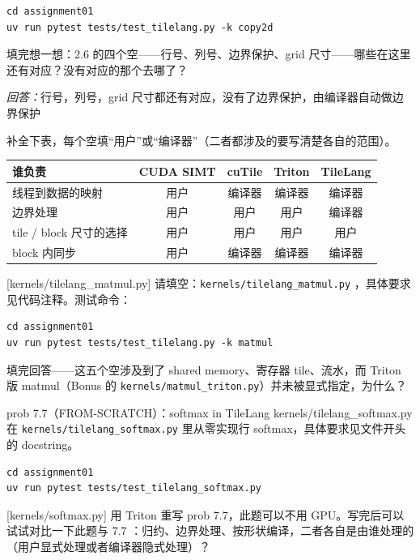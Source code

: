 \documentclass[11pt,a4paper,fontset=none]{ctexart}
\begin{document}
\begin{lstlisting}
cd assignment01
uv run pytest tests/test_tilelang.py -k copy2d
\end{lstlisting}

填完想一想：2.6 的四个空——行号、列号、边界保护、grid 尺寸——哪些在这里还有对应？没有对应的那个去哪了？
\par\noindent\textit{回答：}行号，列号，grid 尺寸都还有对应，没有了边界保护，由编译器自动做边界保护

补全下表，每个空填“用户”或“编译器”（二者都涉及的要写清楚各自的范围）。

\begin{center}\small
\begin{tabular}{@{}lcccc@{}}
\toprule
谁负责 & CUDA SIMT & cuTile & Triton & TileLang \\
\midrule
线程到数据的映射 & 用户 & 编译器 & 编译器 & 编译器\\
边界处理 & 用户 & 用户 & 用户 & 编译器\\
tile / block 尺寸的选择 & 用户 & 用户 & 用户 & 用户\\
block 内同步 & 用户 & 编译器 & 编译器 & 编译器\\
\bottomrule
\end{tabular}
\end{center}

[kernels/tilelang\_matmul.py]
请填空：\texttt{kernels/tilelang\_matmul.py} ，具体要求见代码注释。测试命令：

\begin{lstlisting}
cd assignment01
uv run pytest tests/test_tilelang.py -k matmul
\end{lstlisting}

填完回答——这五个空涉及到了 shared memory、寄存器 tile、流水，而 Triton 版 matmul（Bonus 的 \texttt{kernels/matmul\_triton.py}）并未被显式指定，为什么？

\begin{capstone}{prob 7.7（FROM-SCRATCH）：softmax in TileLang \hfill {\footnotesize\ttfamily kernels/tilelang\_softmax.py}}
在 \texttt{kernels/tilelang\_softmax.py} 里从零实现行 softmax，具体要求见文件开头的 docstring。
\end{capstone}

\begin{lstlisting}
cd assignment01
uv run pytest tests/test_tilelang_softmax.py
\end{lstlisting}

[kernels/softmax.py]
用 Triton 重写 prob 7.7，此题可以不用 GPU。写完后可以试试对比一下此题与 7.7 ：归约、边界处理、按形状编译，二者各自是由谁处理的（用户显式处理或者编译器隐式处理）？
\end{document}
